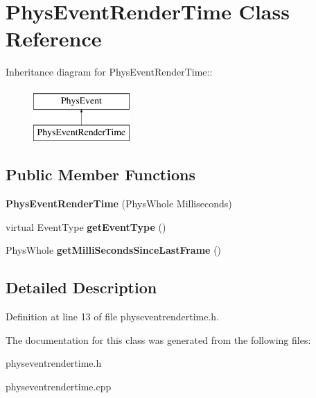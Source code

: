 \hypertarget{classPhysEventRenderTime}{
\section{PhysEventRenderTime Class Reference}
\label{d4/d83/classPhysEventRenderTime}
}
Inheritance diagram for PhysEventRenderTime::\begin{figure}[H]
\begin{center}
\leavevmode
\includegraphics[height=2cm]{d4/d83/classPhysEventRenderTime}
\end{center}
\end{figure}
\subsection*{Public Member Functions}
\begin{DoxyCompactItemize}
\item 
\hypertarget{classPhysEventRenderTime_af6ad859225b0c869af9145844ac5a248}{
{\bfseries PhysEventRenderTime} (PhysWhole Milliseconds)}
\label{d4/d83/classPhysEventRenderTime_af6ad859225b0c869af9145844ac5a248}

\item 
\hypertarget{classPhysEventRenderTime_ac0c4d6e6a547d16579e371a4a5ea8ae1}{
virtual EventType {\bfseries getEventType} ()}
\label{d4/d83/classPhysEventRenderTime_ac0c4d6e6a547d16579e371a4a5ea8ae1}

\item 
\hypertarget{classPhysEventRenderTime_aaba6aa77d58877dc8b3784c1ebcfe7b6}{
PhysWhole {\bfseries getMilliSecondsSinceLastFrame} ()}
\label{d4/d83/classPhysEventRenderTime_aaba6aa77d58877dc8b3784c1ebcfe7b6}

\end{DoxyCompactItemize}


\subsection{Detailed Description}


Definition at line 13 of file physeventrendertime.h.

The documentation for this class was generated from the following files:\begin{DoxyCompactItemize}
\item 
physeventrendertime.h\item 
physeventrendertime.cpp\end{DoxyCompactItemize}

